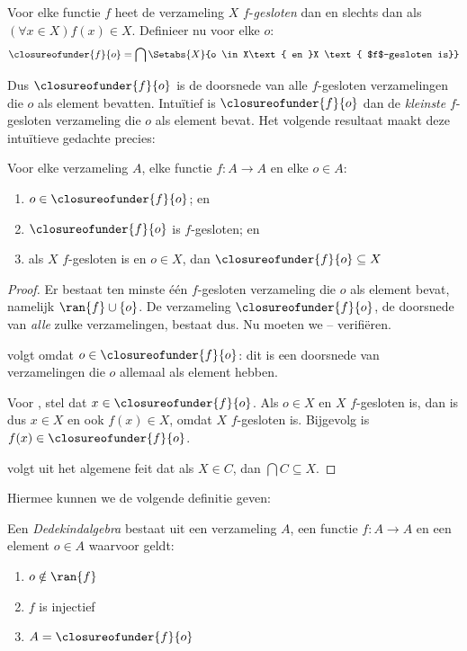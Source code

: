 \documentclass[openany]{memoir}
\begin{document}
\begin{defn}
	Voor elke functie $f$ heet de verzameling $X$ $f$-\emph{gesloten}
	{dan en slechts dan als} $(\forall x \in X)f(x) \in X$. Definieer
	nu voor elke $o$:
	$$\closureofunder{f}{o} = \bigcap\Setabs{X}{o \in X\text{ en }X
\text{ $f$-gesloten is}}$$
\end{defn}

Dus $\closureofunder{f}{o}$ is de doorsnede van alle $f$-gesloten
verzamelingen die $o$ als element bevatten. Intuïtief is
$\closureofunder{f}{o}$ dan de \emph{kleinste} $f$-gesloten verzameling
die $o$ als element bevat. Het volgende resultaat maakt deze
intuïtieve gedachte precies:
\begin{lem}
	Voor elke verzameling $A$, elke functie $f \colon A \to A$ en elke
	$o \in A$:
	\begin{enumerate}
		\item{} $o \in \closureofunder{f}{o}$; en
		\item{} $\closureofunder{f}{o}$ is $f$-gesloten; en
		\item{} als $X$ $f$-gesloten is en $o \in
		X$, dan $\closureofunder{f}{o} \subseteq X$
	\end{enumerate}
\end{lem}

\begin{proof}
Er bestaat ten minste één $f$-gesloten verzameling die $o$ als element
bevat, namelijk $\ran{f}\cup \{o\}$. De verzameling
$\closureofunder{f}{o}$, de doorsnede van \emph{alle} zulke
verzamelingen, bestaat dus. Nu moeten we
-- verifiëren.

 volgt omdat $o \in \closureofunder{f}{o}$: dit
is een doorsnede van verzamelingen die $o$ allemaal als element hebben.

Voor , stel dat $x \in \closureofunder{f}{o}$.
Als $o \in X$ en $X$ $f$-gesloten is, dan is dus $x \in X$ en ook
$f(x) \in X$, omdat $X$ $f$-gesloten is. Bijgevolg is
$f(x) \in \closureofunder{f}{o}$.

 volgt uit het algemene feit dat als $X \in C$,
dan $\bigcap C \subseteq X$.
\end{proof}

Hiermee kunnen we de volgende definitie geven:

\begin{defn}
Een \emph{Dedekindalgebra} bestaat uit een verzameling $A$, een functie
$f \colon A \to A$ en een element $o \in A$ waarvoor geldt:
	\begin{enumerate}
		\item {} $o \notin \ran{f}$
		\item {} $f$ is injectief
		\item {} $A = \closureofunder{f}{o}$
	\end{enumerate}
\end{defn}
\end{document}
